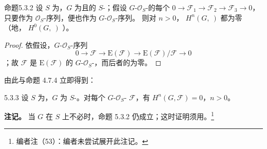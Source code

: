 \begin{SGAresult}{命题}{5.3.2}
设 $S$ 为，$G$ 为且的 $S$-；假设 $G$-$\mathcal O_S$-的每个 $0\to\mathcal F_1\to\mathcal F_2\to\mathcal F_3\to0$，只要作为 $\mathcal O_S$-序列，便也作为 $G$-$\mathcal O_S$-序列。
则对 $n>0$， $H^n(G,\ )$ 都为零（地， $H^0(G,\ )$ ）。
\end{SGAresult}
\begin{proof}
依假设，$G$-$\mathcal O_S$-序列
\[
0\longrightarrow\mathcal F\longrightarrow\mathrm E(\mathcal F)\longrightarrow\mathrm E(\mathcal F)/\mathcal F\longrightarrow0
\]
；故 $\mathcal F$ 是 $\mathrm E(\mathcal F)$ 的 $G$-$\mathcal O_S$-，而后者的为零。
\end{proof}
由此与命题 4.7.4 立即得到：
\begin{SGAresult}{}{5.3.3}
设 $S$ 为，$G$ 为 $S$-。对每个 $G$-$\mathcal O_S$- $\mathcal F$，有 $H^n(G,\mathcal F)=0$，$n>0$。
\end{SGAresult}

\textbf{注记。} 当 $G$ 在 $S$ 上不必时，命题 5.3.2 仍成立；这时证明须用。\footnote{编者注（53）：编者未尝试展开此注记。}

